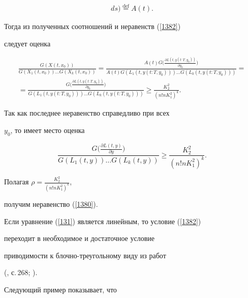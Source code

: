 \begin{pf}
\begin{gather*}
ds\bigg)\overset{\text{def}}{=}{}A(t).


\end{gather*}


Тогда из полученных соотношений и неравенств (\ref{1382})


следует оценка


\begin{multline*}


\frac{G(X(t,x_{0}))}{G(X_{1}(t,x_{0}))\dotsc G(X_{k}(t,x_{0}))}=


\frac{A(t)


G\big(\frac{\partial L(t,y(t:T,y_{0}))}{\partial y_{0}}\big)}


{A(t)G(L_{1}(t,y(t:T,y_{0})))\dotsc G(L_{k}(t,y(t:T,y_{0})))}=\\


%


=\frac{G\big(\frac{\partial L(t,y(t:T,y_{0}))}{\partial y_{0}}\big)}


{G(L_{1}(t,y(t:T,y_{0})))\dotsc G(L_{k}(t,y(t:T,y_{0})))}\geq


\frac{K_{2}^{2}}{(n!nK_{1}^{2})^{k}}.


\end{multline*}


Так как последнее неравенство справедливо при всех


$y_{0}$, то имеет место оценка


$$


\frac{G\big(\frac{\partial L(t,y)}{\partial y}\big)}


{G(L_{1}(t,y))\dotsc G(L_{k}(t,y))}\geq \frac{K_{2}^{2}}{(n!nK_{1}^{2})^{k}}.


$$


Полагая $\rho=\frac{K_{2}^{2}}{(n!nK_{1}^{2})^{k}}$,


получим неравенство (\ref{1380}).


\end{pf}





Если уравнение (\ref{131}) является линейным, то условие (\ref{1382})


переходит в необходимое и достаточное условие 


приводимости к блочно-треугольному виду из работ


(\cite{BilTe}, с.\,268; \cite{BilOb}).





Следующий пример показывает, что 


